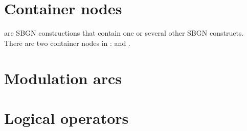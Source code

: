





\section{Container nodes}
\label{sec:af:CNs}

 are SBGN constructions that contain one or several other SBGN constructs.  There are two container nodes in \SBGNAFLone:  and .





\section{Modulation arcs}\label{sec:af:arcs}







\section{Logical operators}\label{sec:af:logic}




